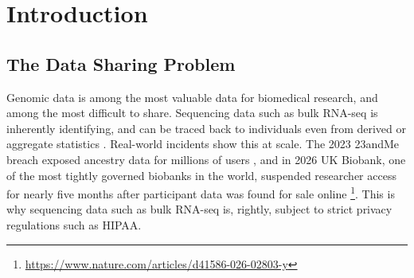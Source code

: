 \documentclass[webpdf,contemporary,large]{oup-authoring-template}%
\theoremstyle{thmstyleone}%
\theoremstyle{thmstyletwo}%
\theoremstyle{thmstylethree}%
\begin{document}

\maketitle

\section{Introduction}

\subsection{The Data Sharing Problem}

Genomic data is among the most valuable data for biomedical research, and among the most difficult to share. Sequencing data such as bulk RNA-seq is inherently identifying, and can be traced back to individuals even from derived or aggregate statistics \citep{erlich2018identity,homer2008resolving}. Real-world incidents show this at scale. The 2023 23andMe breach exposed ancestry data for millions of users \citep{andme2023breach}, and in 2026 UK Biobank, one of the most tightly governed biobanks in the world, suspended researcher access for nearly five months after participant data was found for sale online \citep{kwon2026ukbiobank}\footnote{\url{https://www.nature.com/articles/d41586-026-02803-y}}. This is why sequencing data such as bulk RNA-seq is, rightly, subject to strict privacy regulations such as HIPAA.
\end{document}
